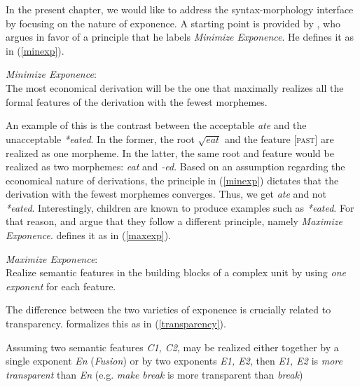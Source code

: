 \documentclass[output=paper,colorlinks,citecolor=brown,footheight=42pt]{langscibook}
\begin{document}
In the present chapter, we would like to address the syntax-morphology interface by focusing on the nature of exponence. A starting point is provided by \citet{siddiqi2009}, who argues in favor of a principle that he labels \textit{Minimize Exponence}. He defines it as in (\ref{minexp}).

\begin{exe}
\ex\label{minexp} \textit{Minimize Exponence}:\\ 
The most economical derivation will be the one that maximally realizes all the formal features of the derivation with the fewest morphemes.
\end{exe}

\noindent
An example of this is the contrast between the acceptable \textit{ate} and the unacceptable \textit{*eated}. In the former, the root $\sqrt{\textit{eat}}$ and the feature [\textsc{past}] are realized as one morpheme. In the latter, the same root and feature would be realized as two morphemes: \textit{eat} and \textit{-ed}. Based on an assumption regarding the economical nature of derivations, the principle in (\ref{minexp}) dictates that the derivation with the fewest morphemes converges. Thus, we get \textit{ate} and not \textit{*eated}. 
Interestingly, children are known to produce examples such as \textit{*eated}. For that reason, \citet{alexiadou2021} and \citet{heinetal2022} argue that they follow a different principle, namely \textit{Maximize Exponence}. \citet{alexiadou2021} defines it as in (\ref{maxexp}).

\begin{exe}
\ex\label{maxexp} \textit{Maximize Exponence}: \\ Realize semantic features in the building blocks of a complex unit by using \textit{one exponent} for each feature.
\end{exe}

The difference between the two varieties of exponence is crucially related to transparency. \citet{alexiadou2021} formalizes this as in (\ref{transparency}).

\begin{exe}
\ex\label{transparency} Assuming two semantic features \textit{C1, C2}, may be realized either together by a single exponent \textit{En} (\textit{Fusion}) or by two exponents \textit{E1, E2}, then \textit{E1, E2} is \textit{more transparent} than \textit{En} (e.g. \textit{make break} is more transparent than \textit{break})
\end{exe}
\end{document}
